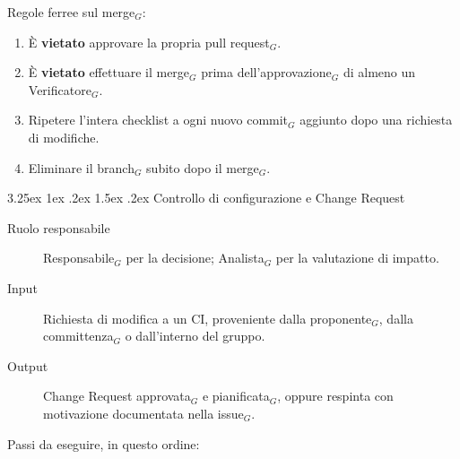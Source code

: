 \documentclass[a4paper, 10pt]{article}
\makeatletter
\renewcommand\paragraph{\@startsection{paragraph}{4}{\z@}%
  {3.25ex \@plus1ex \@minus .2ex}%
  {1.5ex \@plus .2ex}%
  {\normalfont\normalsize\bfseries}}
\makeatother
\begin{document}
\noindent Regole ferree sul merge$_G$:
\begin{enumerate}
    \item È \textbf{vietato} approvare la propria pull request$_G$.
    \item È \textbf{vietato} effettuare il merge$_G$ prima dell'approvazione$_G$ di almeno un Verificatore$_G$.
    \item Ripetere l'intera checklist a ogni nuovo commit$_G$ aggiunto dopo una richiesta di modifiche.
    \item Eliminare il branch$_G$ subito dopo il merge$_G$.
\end{enumerate}

\paragraph{Controllo di configurazione e Change Request}

\begin{description}
    \item[Ruolo responsabile] Responsabile$_G$ per la decisione; Analista$_G$ per la valutazione di impatto.
    \item[Input] Richiesta di modifica a un CI, proveniente dalla proponente$_G$, dalla committenza$_G$ o dall'interno del gruppo.
    \item[Output] Change Request approvata$_G$ e pianificata$_G$, oppure respinta con motivazione documentata nella issue$_G$.
\end{description}

\noindent Passi da eseguire, in questo ordine:
\end{document}
